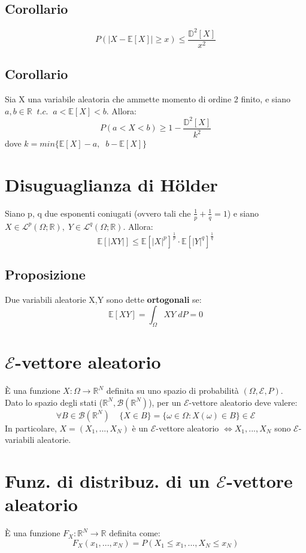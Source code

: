 \documentclass{article}
\begin{document}
\subsection*{Corollario}
\[ P(|X - \mathbb{E}[X]| \geq x) \leq \frac{\mathbb{D}^{2}[X]}{x^{2}} \]

\subsection*{Corollario}
Sia X una variabile aleatoria che ammette momento di ordine 2 finito, e siano $a,b \in \mathbb{R} \; \; t.c. \; \; a<\mathbb{E}[X]<b$. Allora:
\[ P(a<X<b) \geq 1 - \frac{\mathbb{D}^{2}[X]}{k^{2}} \]
dove $k = min\{ \mathbb{E}[X]-a, \; \; b-\mathbb{E}[X]\}$

\section*{Disuguaglianza di H\"older}
Siano p, q due esponenti coniugati (ovvero tali che $\frac{1}{p}+\frac{1}{q} = 1$) e siano\\
$X \in \mathcal{L}^{p}(\Omega; \mathbb{R}), \; Y \in \mathcal{L}^{q}(\Omega; \mathbb{R})$. Allora:
\[ \mathbb{E}[|XY|] \leq \mathbb{E}[|X|^{p}]^{\frac{1}{p}} \cdot \mathbb{E}[|Y|^{q}]^{\frac{1}{q}} \]

\subsection*{Proposizione}
Due variabili aleatorie X,Y sono dette \textbf{ortogonali} se:
\[ \mathbb{E}[XY] = \int_{\Omega}^{}XY \; dP = 0 \]

\section*{$\mathcal{E}$-vettore aleatorio}
\`E una funzione $X: \Omega \to \mathbb{R}^{N}$  definita su uno spazio di probabilità $(\Omega, \mathcal{E}, P)$.\\
Dato lo spazio degli stati ($\mathbb{R}^{N}, \mathcal{B}(\mathbb{R}^{N})$), per un $\mathcal{E}$-vettore aleatorio deve valere:
\[ \forall B \in \mathcal{B}(\mathbb{R}^{N}) \; \; \; \; \{X \in B\} = \{\omega \in \Omega : X(\omega) \in B\} \in \mathcal{E} \]
In particolare, $X = (X_{1},..., X_{N})$ è un $\mathcal{E}$-vettore aleatorio $\iff X_{1},..., X_{N}$ sono $\mathcal{E}$-variabili aleatorie.

\section*{Funz. di distribuz. di un $\mathcal{E}$-vettore aleatorio}
\`E una funzione $F_{X}: \mathbb{R}^{N} \to \mathbb{R}$ definita come:
\[ F_{X}(x_{1},..., x_{N}) = P(X_{1} \leq x_{1},..., X_{N} \leq x_{N}) \]
\end{document}

